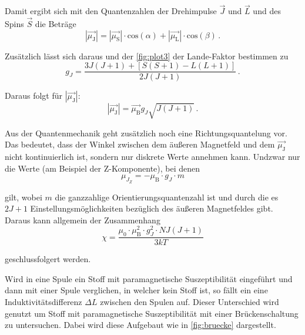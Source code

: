 Damit ergibt sich mit den Quantenzahlen der Drehimpulse $\vec{J}$ und $\vec{L}$ und des Spins $\vec{S}$ die Beträge
\begin{equation*}
        |\vec{\mu_\text{J}}| = |\vec{\mu_\text{S}}| \cdot \text{cos}\left(\alpha \right) + 
        |\vec{\mu_\text{L}}| \cdot \text{cos}\left(\beta \right) \, .
\end{equation*}

Zusätzlich lässt sich daraus und der \autoref{fig:plot3} der Lande-Faktor bestimmen zu
\begin{equation*}
        g_J = \frac{3J(J+1) + [S(S+1) - L(L+1)]} {2 J(J+1)} \, .
\end{equation*}

Daraus folgt für $|\vec{\mu_\text{J}}|$:
\begin{equation}
    |\vec{\mu_\text{J}}| = \vec{\mu_\text{B}} g_J \sqrt{J (J+1)}  \, .
\end{equation}

\noindent
Aus der Quantenmechanik geht zusätzlich noch eine Richtungsquantelung vor. Das bedeutet, dass der Winkel zwischen dem äußeren Magnetfeld und dem $\vec{\mu_\text{J}}$
nicht kontinuierlich ist, sondern nur diskrete Werte annehmen kann. Undzwar nur die Werte (am Beispiel der Z-Komponente), bei denen 
\begin{equation}
        \mu_{J_Z} = - \mu_\text{B} \cdot g_J \cdot m
\end{equation}

\noindent
gilt, wobei $m$ die ganzzahlige Orientierungsquantenzahl ist und durch die es $2J+1$ Einstellungsmöglichkeiten bezüglich des äußeren Magnetfeldes gibt. Daraus kann allgemein der
Zusammenhang 
\begin{equation}
        \chi = \frac{\mu_0 \cdot \mu_\text{B}^2 \cdot g_J^2 \cdot N J (J+1)}{3kT}
        \label{eqn:theo}
\end{equation}

\noindent
geschlussfolgert werden.

\noindent
Wird in eine Spule ein Stoff mit paramagnetische Suszeptibilität eingeführt und dann mit einer Spule verglichen, in welcher kein Stoff ist, so fällt ein eine Induktivitätsdifferenz
$\Delta L$ zwischen den Spulen auf. Dieser Unterschied wird genutzt um Stoff mit paramagnetische Suszeptibilität mit einer Brückenschaltung zu untersuchen.
Dabei wird diese Aufgebaut wie in \autoref{fig:bruecke} dargestellt.


